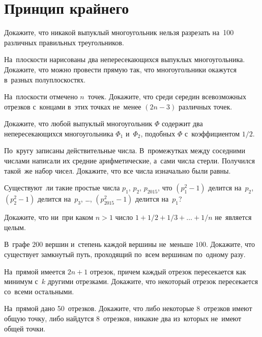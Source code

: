 
\section*{Принцип крайнего}


\begin{problems}

\item
Докажите, что никакой выпуклый многоугольник нельзя разрезать на~100 различных
правильных треугольников.

\item
На~плоскости нарисованы два непересекающихся выпуклых многоугольника.
Докажите, что можно провести прямую так, что многоугольники окажутся в~разных
полуплоскостях.

\item
На~плоскости отмечено $n$~точек.
Докажите, что среди середин всевозможных отрезков с~концами в~этих точках
не~менее $(2 n - 3)$ различных точек.

\item
Докажите, что любой выпуклый многоугольник $\Phi$ содержит два
непересекающихся многоугольника $\Phi_{1}$ и~$\Phi_{2}$, подобных $\Phi$
с~коэффициентом $1 / 2$.

\item
По~кругу записаны действительные числа.
В~промежутках между соседними числами написали их средние арифметические,
а~сами числа стерли.
Получился такой~же набор чисел.
Докажите, что все числа изначально были равны.

\item
Существуют~ли такие простые числа $p_{1}$, $p_{2}$, $p_{2015}$, что
$(p_{1}^2 - 1)$ делится на~$p_{2}$, $(p_{2}^2 - 1)$ делится на~$p_{3}$, \ldots,
$(p_{2015}^2 - 1)$ делится на~$p_{1}$?

\item
Докажите, что ни~при каком $n > 1$ число
$1 + 1 / 2 + 1 / 3 + \ldots + 1 / n$ не~является целым.

\item
В~графе $200$ вершин и~степень каждой вершины не~меньше $100$.
Докажите, что существует замкнутый путь, проходящий по~всем вершинам по~одному
разу.

\item
На~прямой имеется $2 n + 1$ отрезок, причем каждый отрезок пересекается как
минимум с~$k$ другими отрезками.
Докажите, что некоторый отрезок пересекается со~всеми остальными.

\item
На~прямой дано 50~отрезков.
Докажите, что либо некоторые 8~отрезков имеют общую точку, либо найдутся
8~отрезков, никакие два из~которых не~имеют общей точки.

\end{problems}

